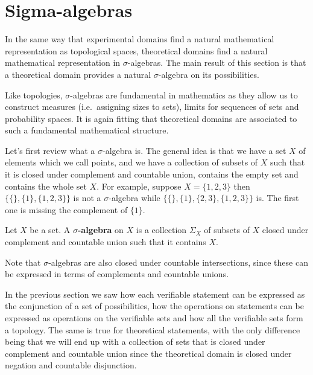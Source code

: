 \documentclass[11pt,letterpaper,fleqn]{memoir} %
\begin{document}
\section{Sigma-algebras}

In the same way that experimental domains find a natural mathematical representation as topological spaces, theoretical domains find a natural mathematical representation in $\sigma$-algebras. The main result of this section is that a theoretical domain provides a natural $\sigma$-algebra on its possibilities.

Like topologies, $\sigma$-algebras are fundamental in mathematics as they allow us to construct measures (i.e.~assigning sizes to sets), limits for sequences of sets and probability spaces. It is again fitting that theoretical domains are associated to such a fundamental mathematical structure.

Let's first review what a $\sigma$-algebra is. The general idea is that we have a set $X$ of elements which we call points, and we have a collection of subsets of $X$ such that it is closed under complement and countable union, contains the empty set and contains the whole set $X$. For example, suppose $X = \{1,2,3\}$ then  $\{\{\},\{1\},\{1,2,3\}\}$ is not a $\sigma$-algebra while $\{\{\},\{1\}, \{2,3\},\{1,2,3\}\}$ is. The first one is missing the complement of $\{1\}$.

\begin{mathSection}
	\begin{defn}
		Let $X$ be a set. A \textbf{$\sigma$-algebra} on $X$ is a collection $\Sigma_X$ of subsets of $X$ closed under complement and countable union such that it contains $X$.
	\end{defn}
\end{mathSection}

Note that $\sigma$-algebras are also closed under countable intersections, since these can be expressed in terms of complements and countable unions.

In the previous section we saw how each verifiable statement can be expressed as the conjunction of a set of possibilities, how the operations on statements can be expressed as operations on the verifiable sets and how all the verifiable sets form a topology. The same is true for theoretical statements, with the only difference being that we will end up with a collection of sets that is closed under complement and countable union since the theoretical domain is closed under negation and countable disjunction.
\end{document}

